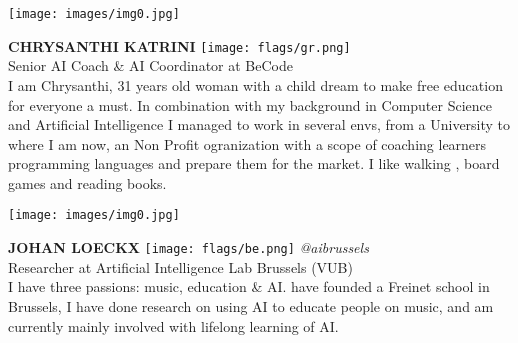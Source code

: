 \noindent
\begin{minipage}{0.3\textwidth}
\centering
\texttt{[image: images/img0.jpg]}
\end{minipage}
\hfill
\begin{minipage}{0.6\textwidth}\raggedright
\color{color1}\uppercase{\textbf{Chrysanthi Katrini}}
\color{color2}\hspace{0.2cm}\texttt{[image: flags/gr.png]}
\\
Senior AI Coach \& AI Coordinator at BeCode\\
{\footnotesize I am Chrysanthi, 31 years old woman with a child dream to make free education for everyone a must. In combination with my background in Computer Science and Artificial Intelligence I managed to work in several envs, from a University to where I am now, an Non Profit ogranization with a scope of coaching learners programming languages and prepare them for the market. I like walking , board games and reading books. }\\
\end{minipage}
\newline\newline\newline

\noindent
\begin{minipage}{0.3\textwidth}
\centering
\texttt{[image: images/img0.jpg]}
\end{minipage}
\hfill
\begin{minipage}{0.6\textwidth}\raggedright
\color{color1}\uppercase{\textbf{Johan Loeckx}}
\color{color2}\hspace{0.2cm}\texttt{[image: flags/be.png]}
\hspace{0.2cm}\textit{@aibrussels}
\\
Researcher at Artificial Intelligence Lab Brussels (VUB)\\
{\footnotesize I have three passions: music, education \& AI.  have founded a Freinet school in Brussels, I have done research on using AI to educate people on music, and am currently mainly involved with lifelong learning of AI.}\\
\end{minipage}
\newline\newline\newline


